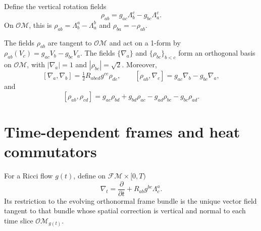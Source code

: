 \begin{definition}
\label{def:chow-ii-rotation-fields}


Define the vertical rotation fields
\[
 \rho_{ab}=g_{ac}\Lambda^c_b-g_{bc}\Lambda^c_a.
\]
On $\mathcal O\mathcal M$, this is $\rho_{ab}=\Lambda^a_b-\Lambda^b_a$ and
$\rho_{ba}=-\rho_{ab}$.
\end{definition}

\begin{lemma}
\label{lem:chow-ii-orthonormal-frame-bundle}


The fields $\rho_{ab}$ are tangent to $\mathcal O\mathcal M$ and act on a
1-form by $\rho_{ab}(V_c)=g_{ac}V_b-g_{bc}V_a$.  The fields
$\{\nabla_a\}$ and $\{\rho_{bc}\}_{b<c}$ form an orthogonal basis on
$\mathcal O\mathcal M$, with $|\nabla_a|=1$ and $|\rho_{bc}|=\sqrt2$.  Moreover,
\[
 [\nabla_a,\nabla_b]=\tfrac12R_{abcd}g^{ce}\rho_{de},
 \qquad
 [\rho_{ab},\nabla_c]=g_{ac}\nabla_b-g_{bc}\nabla_a,
\]
and
\[
 [\rho_{ab},\rho_{cd}]=g_{ac}\rho_{bd}+g_{bd}\rho_{ac}
 -g_{ad}\rho_{bc}-g_{bc}\rho_{ad}.
\]
\end{lemma}

\section{Time-dependent frames and heat commutators}

\begin{definition}
\label{def:chow-ii-frame-time-vector}


For a Ricci flow $g(t)$, define on $\mathcal F\mathcal M\times[0,T)$
\[
 \nabla_t=\frac{\partial}{\partial t}+R_{ab}g^{bc}\Lambda^a_c.
\]
Its restriction to the evolving orthonormal frame bundle is the unique vector
field tangent to that bundle whose spatial correction is vertical and normal
to each time slice $\mathcal O\mathcal M_{g(t)}$.
\end{definition}

